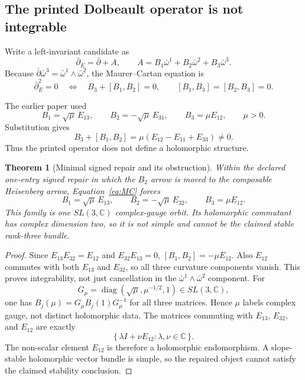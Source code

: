 \documentclass[11pt]{article}
\newcommand{\C}{\mathbb{C}}
\newtheorem{theorem}{Theorem}[section]
\theoremstyle{definition}
\theoremstyle{remark}
\begin{document}
\subsection{The printed Dolbeault operator is not integrable}

Write a left-invariant candidate as
\begin{equation}
\bar\partial_E=\bar\partial+A,\qquad
A=B_1\bar\omega^1+B_2\bar\omega^2+B_3\bar\omega^3.
\label{eq:A}
\end{equation}
Because
\(\bar\partial\bar\omega^3=\bar\omega^1\wedge\bar\omega^2\),
the Maurer--Cartan equation is
\begin{equation}
\bar\partial_E^2=0
\quad\Longleftrightarrow\quad
B_3+[B_1,B_2]=0,\qquad [B_1,B_3]=[B_2,B_3]=0.
\label{eq:MC}
\end{equation}

The earlier paper used
\begin{equation}
B_1=\sqrt{\mu}\,E_{13},\qquad
B_2=-\sqrt{\mu}\,E_{31},\qquad
B_3=\mu E_{12},\qquad \mu>0.
\label{eq:oldB}
\end{equation}
Substitution gives
\[
B_3+[B_1,B_2]
=\mu(E_{12}-E_{11}+E_{33})\neq0.
\]
Thus the printed operator does not define a holomorphic structure.

\begin{theorem}[Minimal signed repair and its obstruction]
\label{thm:repair}
Within the declared one-entry signed repair in which the \(B_2\) arrow is
moved to the composable Heisenberg arrow, Equation~\eqref{eq:MC} forces
\begin{equation}
B_1=\sqrt{\mu}\,E_{13},\qquad
B_2=-\sqrt{\mu}\,E_{32},\qquad
B_3=\mu E_{12}.
\label{eq:repair}
\end{equation}
This family is one \(SL(3,\C)\) complex-gauge orbit.  Its holomorphic
commutant has complex dimension two, so it is not simple and cannot be the
claimed stable rank-three bundle.
\end{theorem}

\begin{proof}
Since \(E_{13}E_{32}=E_{12}\) and \(E_{32}E_{13}=0\),
\([B_1,B_2]=-\mu E_{12}\).  Also \(E_{12}\) commutes with both
\(E_{13}\) and \(E_{32}\), so all three curvature components vanish.
This proves integrability, not just cancellation in the
\(\bar\omega^1\wedge\bar\omega^2\) component.
For
\[
G_\mu=\operatorname{diag}(\sqrt{\mu},\mu^{-1/2},1)
\in SL(3,\C),
\]
one has \(B_j(\mu)=G_\mu B_j(1)G_\mu^{-1}\) for all three matrices.  Hence
\(\mu\) labels complex gauge, not distinct holomorphic data.
The matrices commuting with \(E_{13}\), \(E_{32}\), and \(E_{12}\) are exactly
\[
\{\,\lambda I+\nu E_{12}:\lambda,\nu\in\C\,\}.
\]
The non-scalar element \(E_{12}\) is therefore a holomorphic endomorphism.
A slope-stable holomorphic vector bundle is simple, so the repaired object
cannot satisfy the claimed stability conclusion.
\end{proof}
\end{document}
